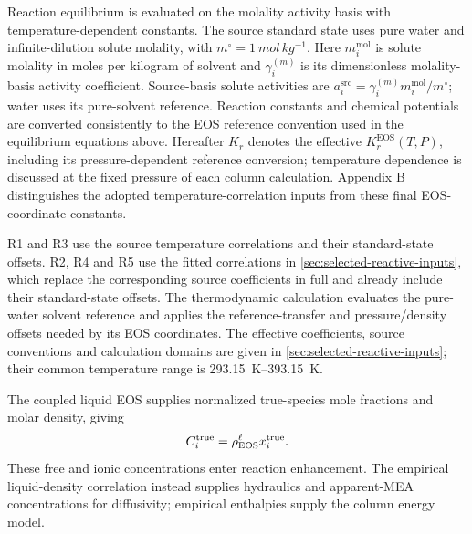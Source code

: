 Reaction equilibrium is evaluated on the molality activity basis with temperature-dependent constants.
The source standard state uses pure water and infinite-dilution solute molality, with \(m^\circ=\qty{1}{mol\,kg^{-1}}\).
Here $m_i^{\mathrm{mol}}$ is solute molality in moles per kilogram of solvent and $\gamma_i^{(m)}$ is its dimensionless molality-basis activity coefficient.
Source-basis solute activities are \(a_i^{\mathrm{src}}=\gamma_i^{(m)}m_i^{\mathrm{mol}}/m^\circ\); water uses its pure-solvent reference.
Reaction constants and chemical potentials are converted consistently to the EOS reference convention used in the equilibrium equations above.
Hereafter $K_r$ denotes the effective $K_r^{\mathrm{EOS}}(T,P)$, including its pressure-dependent reference conversion; temperature dependence is discussed at the fixed pressure of each column calculation.
Appendix B distinguishes the adopted temperature-correlation inputs from these final EOS-coordinate constants.

R1 and R3 use the source temperature correlations and their standard-state offsets.
R2, R4 and R5 use the fitted correlations in \cref{sec:selected-reactive-inputs}, which replace the corresponding source coefficients in full and already include their standard-state offsets.
The thermodynamic calculation evaluates the pure-water solvent reference and applies the reference-transfer and pressure/density offsets needed by its EOS coordinates.
The effective coefficients, source conventions and calculation domains are given in \cref{sec:selected-reactive-inputs}; their common temperature range is \qtyrange{293.15}{393.15}{K}.

The coupled liquid EOS supplies normalized true-species mole fractions and molar density, giving
\begin{equation}
C_i^{\mathrm{true}}=\rho_{\mathrm{EOS}}^{\ell}x_i^{\mathrm{true}}.
\end{equation}
These free and ionic concentrations enter reaction enhancement.
The empirical liquid-density correlation instead supplies hydraulics and apparent-MEA concentrations for diffusivity; empirical enthalpies supply the column energy model.


